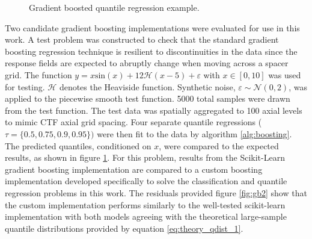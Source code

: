 

  


\begin{figure}[H]%
    \centering
    \qquad
    \qquad
    \qquad
    \qquad
    \caption[Gradient boosted quantile regression example.]{Gradient boosted quantile regression example.}%
    \label{fig:gb1}%
\end{figure}

Two candidate gradient boosting implementations were evaluated for use in this work.  A test problem was constructed to check that the standard gradient boosting regression technique is resilient to discontinuities in the data since the response fields are expected to abruptly change when moving across a spacer grid.  The function $y = x \mathrm{sin}(x) +12 \mathcal H(x-5)+\varepsilon$ with $x\in [0,10]$ was used for testing.  $\mathcal H$ denotes the Heaviside function. Synthetic noise, $\varepsilon \sim \mathcal N(0,2)$, was applied to the piecewise smooth test function.   5000 total samples were drawn from the test function. The test data was spatially aggregated to 100 axial levels to mimic CTF axial grid spacing.  Four separate quantile regressions ($\tau = \{0.5, 0.75, 0.9, 0.95 \})$ were then fit to the data by algorithm \ref{alg:boosting}. The predicted quantiles, conditioned on $x$, were compared to the expected results, as shown in figure \ref{fig:gb1}. For this problem, results from the Scikit-Learn gradient boosting implementation are compared to a custom boosting implementation developed specifically to solve the classification and quantile regression problems in this work.  The residuals provided figure \ref{fig:gb2} show that the custom implementation performs similarly to the well-tested scikit-learn implementation with both models agreeing with the theoretical large-sample quantile distributions provided by equation \ref{eq:theory_qdist_1}.

